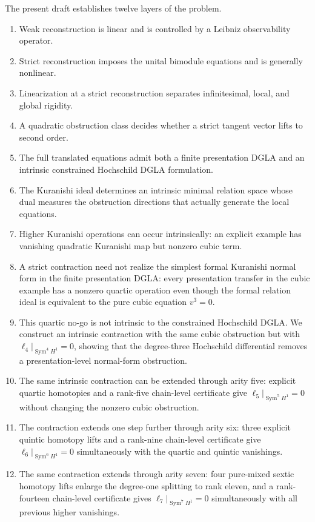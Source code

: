 \documentclass[11pt]{amsart}
\begin{document}
The present draft establishes twelve layers of the problem.
\begin{enumerate}[label=(\roman*)]
\item Weak reconstruction is linear and is controlled by a Leibniz observability operator.
\item Strict reconstruction imposes the unital bimodule equations and is generally nonlinear.
\item Linearization at a strict reconstruction separates infinitesimal, local, and global rigidity.
\item A quadratic obstruction class decides whether a strict tangent vector lifts to second order.
\item The full translated equations admit both a finite presentation DGLA and an intrinsic constrained Hochschild DGLA formulation.
\item The Kuranishi ideal determines an intrinsic minimal relation space whose dual measures the obstruction directions that actually generate the local equations.
\item Higher Kuranishi operations can occur intrinsically: an explicit example has vanishing quadratic Kuranishi map but nonzero cubic term.
\item A strict contraction need not realize the simplest formal Kuranishi normal form in the finite presentation DGLA: every presentation transfer in the cubic example has a nonzero quartic operation even though the formal relation ideal is equivalent to the pure cubic equation $v^3=0$.
\item This quartic no-go is not intrinsic to the constrained Hochschild DGLA.  We construct an intrinsic contraction with the same cubic obstruction but with $\ell_4|_{\operatorname{Sym}^4H^1}=0$, showing that the degree-three Hochschild differential removes a presentation-level normal-form obstruction.
\item The same intrinsic contraction can be extended through arity five: explicit quartic homotopies and a rank-five chain-level certificate give $\ell_5|_{\operatorname{Sym}^5H^1}=0$ without changing the nonzero cubic obstruction.
\item The contraction extends one step further through arity six: three explicit quintic homotopy lifts and a rank-nine chain-level certificate give $\ell_6|_{\operatorname{Sym}^6H^1}=0$ simultaneously with the quartic and quintic vanishings.
\item The same contraction extends through arity seven: four pure-mixed sextic homotopy lifts enlarge the degree-one splitting to rank eleven, and a rank-fourteen chain-level certificate gives $\ell_7|_{\operatorname{Sym}^7H^1}=0$ simultaneously with all previous higher vanishings.

\end{enumerate}
\end{document}
